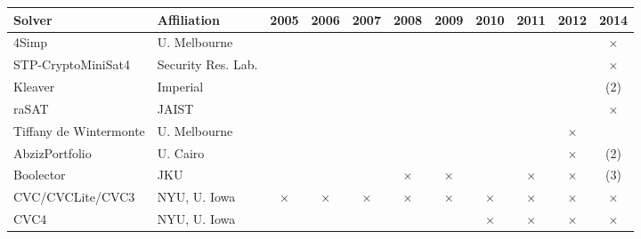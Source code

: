 \documentclass[twoside,11pt]{article}
\begin{document}
\begin{table}[t]
\renewcommand{\mark}[0]{$\times$}
\centering
\setlength{\tabcolsep}{1pt}
\begin{tabular}{|l|l|c|c|c|c|c|c|c|c|c|}
\hline
Solver & Affiliation & 2005 & 2006 & 2007 & 2008 & 2009 & 2010 & 2011 & 2012 & 2014 \\
\hline

4Simp                  & U. Melbourne 	&   &   &   &   &   &   &   &   & \mark  \\							
STP-CryptoMiniSat4     & Security Res. Lab.  &   &   &   &   &   &   &   &   & \mark\\								
Kleaver	               & Imperial       &   &   &   &   &   &   &   &   & (2) \\								
raSAT  	               & JAIST          &   &   &   &   &   &   &   &   & \mark \\								
Tiffany de Wintermonte & U. Melbourne 	&   &   &   &   &   &   &   & \mark &  \\							
AbzizPortfolio         & U. Cairo       &   &   &   &   &   &   &   & \mark & (2)\\							
Boolector              & JKU            &   &   &   & \mark & \mark &   & \mark & \mark & (3)\\
CVC/CVCLite/CVC3       & NYU, U. Iowa   & \mark & \mark & \mark & \mark & \mark & \mark & \mark & \mark & \mark \\
CVC4	                 & NYU, U. Iowa   &   &   &   &   &   & \mark & \mark & \mark & \mark \\


\end{tabular}
\end{table}
\end{document}
